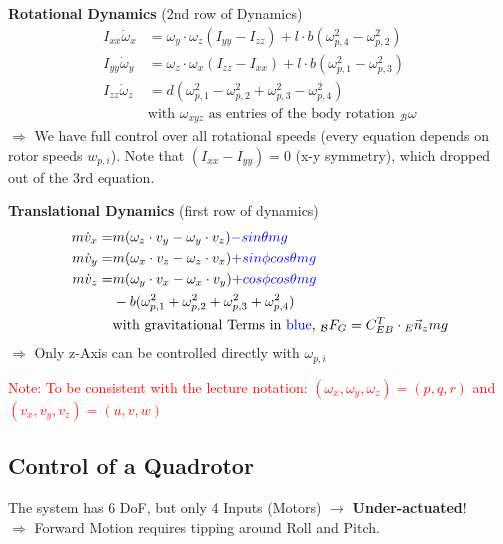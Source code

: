 \documentclass[fontsize=6pt,DIV=calc,a4paper,ngerman]{scrartcl}
\begin{document}
\begin{multicols*}{4}
	\medskip
	\textbf{Rotational Dynamics} (2nd row of Dynamics)
	\begin{align*}
		I_{xx}\dot{\omega}_x & = \omega_y\cdot \omega_z (I_{yy}-I_{zz})+l\cdot b (\omega_{p,4}^2-\omega_{p,2}^2) \\
		I_{yy}\dot{\omega}_y & = \omega_z\cdot \omega_x (I_{zz}-I_{xx})+l\cdot b (\omega_{p,1}^2-\omega_{p,3}^2) \\
		I_{zz}\dot{\omega}_z & = d(\omega_{p,1}^2-\omega_{p,2}^2+\omega_{p,3}^2-\omega_{p,4}^2)                  \\
		                     & \text{with $\omega_{xyz}$ as entries of the body rotation ${}_\mathcal{B}\omega$}
	\end{align*}
	$\Rightarrow$ We have full control over all rotational speeds (every equation depends on rotor speeds $w_{p,i}$). Note that $(I_{xx}-I_{yy})=0$ (x-y symmetry), which dropped out of the 3rd equation.

	\medskip
	\textbf{Translational Dynamics} (first row of dynamics)
	\begin{align*}
		m\dot{v}_x = & m(\omega_z\cdot v_y - \omega_y\cdot v_z)\textcolor{blue}{-sin\theta mg}                                     \\
		m\dot{v}_y = & m(\omega_x\cdot v_z - \omega_z\cdot v_x)\textcolor{blue}{+sin\phi cos\theta mg}                             \\
		m\dot{v}_z = & m(\omega_y\cdot v_x - \omega_x\cdot v_y) \textcolor{blue}{+cos\phi cos\theta mg }                           \\
		             & - b(\omega_{p,1}^2+\omega_{p,2}^2+\omega_{p,3}^2+\omega_{p,4}^2)                                            \\
		             & \text{with gravitational Terms in \textcolor{blue}{blue}, } {}_\mathcal{B}F_G=C_{EB}^T\cdot {}_E\vec{n}_zmg
	\end{align*}
	$\Rightarrow$ Only z-Axis can be controlled directly with $\omega_{p,i}$

	\smallskip
	\textcolor{red}{Note: To be consistent with the lecture notation: $(\omega_x, \omega_y, \omega_z) = (p,q,r) $ and $(v_x, v_y, v_z) = (u, v, w)$}

	\subsection{Control of a Quadrotor}

	The system has 6 DoF, but only 4 Inputs (Motors) $\rightarrow$ \textbf{Under-actuated}! \\
	$\Rightarrow$ Forward Motion requires tipping around Roll and Pitch.


\end{multicols*}
\end{document}
